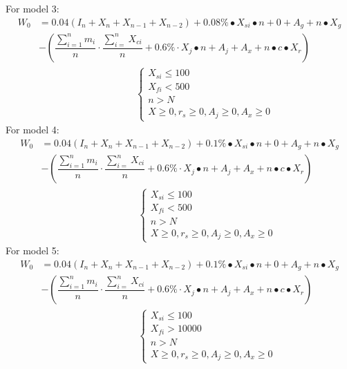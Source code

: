 \documentclass[../mcmpaper]{subfiles}
\begin{document}
For model 3:
\begin{equation}
\begin{aligned}
W_{0}&=0.04\left(I_{n}+X_{n}+X_{n-1}+X_{n-2}\right)+0.08 \% \bullet X_{s i} \bullet n+0+A_{g}+n \bullet X_{g} \\
&-\left(\dfrac{\sum_{i=1}^{n} m_{i}}{n} \cdot \dfrac{\sum_{i=}^{n} X_{c i}}{n}+0.6 \% \cdot X_{j} \bullet n+A_{j}+A_{x}+n \bullet c \bullet X_{r}\right) \\
&\hspace{10em}\left\{\begin{array}{l}
X_{s i} \leq 100 \\
X_{f i}<500 \\
n>N \\
X \geq 0, r_{s} \geq 0, A_{j} \geq 0, A_{x} \geq 0
\end{array}\right.
\end{aligned}
\end{equation}
For model 4:
\begin{equation}
\begin{aligned}
W_{0}&=0.04\left(I_{n}+X_{n}+X_{n-1}+X_{n-2}\right)+0.1 \% \bullet X_{s i} \bullet n+0+A_{g}+n \bullet X_{g} \\
&-\left(\dfrac{\sum_{i=1}^{n} m_{i}}{n} \cdot \dfrac{\sum_{i=}^{n} X_{c i}}{n}+0.6\% \cdot X_{j} \bullet n+A_{j}+A_{x}+n \bullet c \bullet X_{r}\right) \\
&\hspace{10em}\left\{\begin{array}{l}
X_{s i} \leq 100 \\
X_{f i}<500 \\
n>N \\
X \geq 0, r_{s} \geq 0, A_{j} \geq 0, A_{x} \geq 0
\end{array}\right.
\end{aligned}
\end{equation}
For model 5:
\begin{equation}
\begin{aligned}
W_{0}&=0.04\left(I_{n}+X_{n}+X_{n-1}+X_{n-2}\right)+0.1 \% \bullet X_{s i} \bullet n+0+A_{g}+n \bullet X_{g} \\
&-\left(\dfrac{\sum_{i=1}^{n} m_{i}}{n} \cdot \dfrac{\sum_{i=}^{n} X_{c i}}{n}+0.6\% \cdot X_{j} \bullet n+A_{j}+A_{x}+n \bullet c \bullet X_{r}\right) \\
&\hspace{10em}\left\{\begin{array}{l}
X_{s i} \leq 100 \\
X_{f i}>10000 \\
n>N \\
X \geq 0, r_{s} \geq 0, A_{j} \geq 0, A_{x} \geq 0
\end{array}\right.
\end{aligned}
\end{equation}
\end{document}
